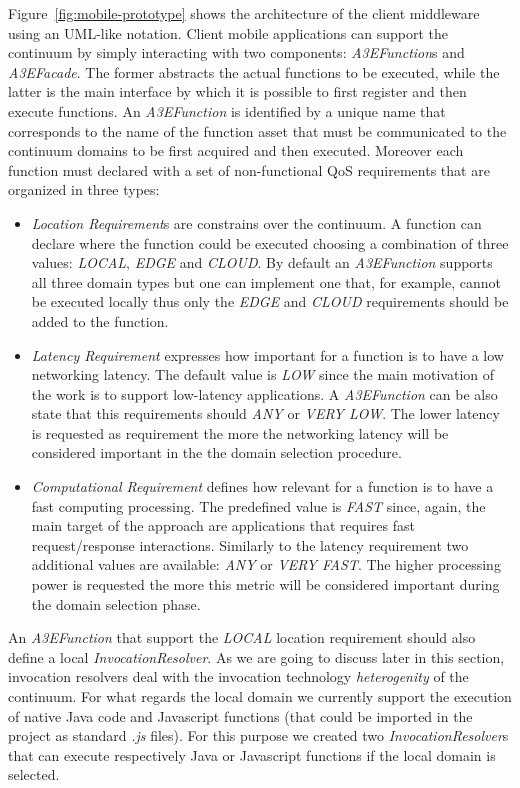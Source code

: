 Figure~\ref{fig:mobile-prototype} shows the architecture of the client middleware using an UML-like notation. Client mobile applications can support the continuum by simply interacting with two components:  \textit{A3EFunction}s and \textit{A3EFacade}. The former abstracts the actual functions to be executed, while the latter is the main interface by which it is possible to first register and then execute functions. An \textit{A3EFunction} is identified by a unique name that corresponds to the name of the function asset that must be communicated to the continuum domains to be first acquired and then executed. Moreover each function must declared with a set of non-functional QoS requirements that are organized in three types: 

\begin{itemize}
	\item \textit{Location Requirement}s are constrains over the continuum. A function can declare where the function could be executed choosing a combination of three values: \textit{LOCAL}, \textit{EDGE} and \textit{CLOUD}. By default an \textit{A3EFunction} supports all three domain types but one can implement one that, for example, cannot be executed locally thus only the \textit{EDGE} and \textit{CLOUD} requirements should be added to the function.    
	\item \textit{Latency Requirement} expresses how important for a function is to have a low networking latency. The default value is \textit{LOW} since the main motivation of the work is to support low-latency applications. A \textit{A3EFunction}  can be also state that this requirements should \textit{ANY} or \textit{VERY LOW}. The lower latency is requested as requirement the more the networking latency will be considered important in the the domain selection procedure.
	\item \textit{Computational Requirement} defines how relevant for a function is to have a fast computing processing. The predefined value is \textit{FAST} since, again, the main target of the approach are applications that requires fast request/response interactions. Similarly to the latency requirement two additional values are available:  \textit{ANY} or \textit{VERY FAST}. The higher  processing power is requested the more this metric will be considered important during the domain selection phase.
\end{itemize}

An \textit{A3EFunction} that support the \textit{LOCAL} location requirement should also define a local \textit{InvocationResolver}. As we are going to discuss later in this section, invocation resolvers deal with the invocation technology \textit{heterogenity}  of the continuum. For what regards the local domain we currently support the execution of native Java code and Javascript functions (that could be imported in the project as standard \textit{.js} files). For this purpose we created two \textit{InvocationResolver}s that can execute respectively Java or Javascript functions if the local domain is selected. 

